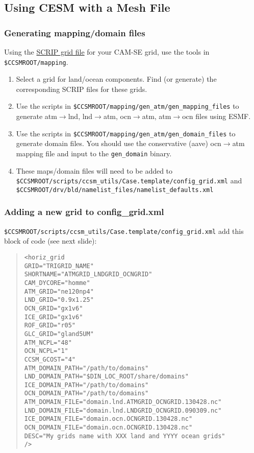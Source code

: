 \documentclass{beamer}
\begin{document}
\subsection{Using CESM with a Mesh File}
\begin{frame}[containsverbatim]
\frametitle{Generating mapping/domain files}
\begin{block}{}
Using the \hyperlink{scrip}{SCRIP grid file} for your CAM-SE grid, use the tools in \verb|$CCSMROOT/mapping|.
\begin{enumerate}
\item Select a grid for land/ocean components. Find (or generate) the corresponding SCRIP files for these grids.
\item Use the scripts in \verb|$CCSMROOT/mapping/gen_atm/gen_mapping_files| to generate atm$\rightarrow$lnd, lnd$\rightarrow$atm, ocn$\rightarrow$atm, atm$\rightarrow$ocn files using ESMF.
\item Use the scripts in \verb|$CCSMROOT/mapping/gen_atm/gen_domain_files| to generate domain files. You should use the conservative (aave) ocn$\rightarrow$atm mapping file and input to the \verb|gen_domain| binary.
\item These maps/domain files will need to be added to \verb|$CCSMROOT/scripts/ccsm_utils/Case.template/config_grid.xml| and \verb|$CCSMROOT/drv/bld/namelist_files/namelist_defaults.xml|
\end{enumerate}
\end{block}
\end{frame}
%
\begin{frame}[containsverbatim]
\frametitle{Adding a new grid to config\_grid.xml }
\begin{block}{}
\verb|$CCSMROOT/scripts/ccsm_utils/Case.template/config_grid.xml| add this block of code (see next slide):
\begin{quote}
\tiny
\begin{verbatim}
<horiz_grid
GRID="TRIGRID_NAME"
SHORTNAME="ATMGRID_LNDGRID_OCNGRID"
CAM_DYCORE="homme"
ATM_GRID="ne120np4"
LND_GRID="0.9x1.25"
OCN_GRID="gx1v6"
ICE_GRID="gx1v6"
ROF_GRID="r05"
GLC_GRID="gland5UM"
ATM_NCPL="48"
OCN_NCPL="1"
CCSM_GCOST="4"
ATM_DOMAIN_PATH="/path/to/domains"
LND_DOMAIN_PATH="$DIN_LOC_ROOT/share/domains"   
ICE_DOMAIN_PATH="/path/to/domains"
OCN_DOMAIN_PATH="/path/to/domains"
ATM_DOMAIN_FILE="domain.lnd.ATMGRID_OCNGRID.130428.nc"
LND_DOMAIN_FILE="domain.lnd.LNDGRID_OCNGRID.090309.nc"
ICE_DOMAIN_FILE="domain.ocn.OCNGRID.130428.nc"
OCN_DOMAIN_FILE="domain.ocn.OCNGRID.130428.nc"
DESC="My grids name with XXX land and YYYY ocean grids"
/>
\end{verbatim}
\end{quote}
\end{block}
\end{frame}
\end{document}
